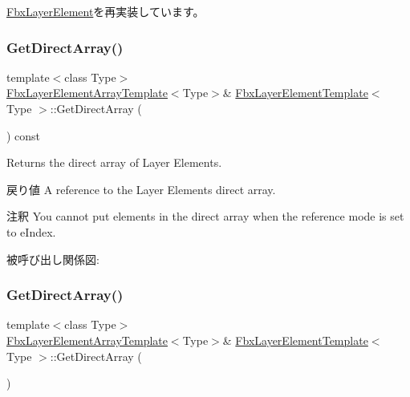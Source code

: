 \hyperlink{class_fbx_layer_element_aa60d2178a7601f0e78a472fa7fd774aa}{Fbx\+Layer\+Element}を再実装しています。

\mbox{\label{class_fbx_layer_element_template_a42afd6d78d902570d7b2724cb0336226}} 
\subsubsection{\texorpdfstring{Get\+Direct\+Array()}{GetDirectArray()}\hspace{0.1cm}{\footnotesize\ttfamily [1/2]}}
{\footnotesize\ttfamily template$<$class Type$>$ \\
\hyperlink{class_fbx_layer_element_array_template}{Fbx\+Layer\+Element\+Array\+Template}$<$Type$>$\& \hyperlink{class_fbx_layer_element_template}{Fbx\+Layer\+Element\+Template}$<$ Type $>$\+::Get\+Direct\+Array (\begin{DoxyParamCaption}{ }\end{DoxyParamCaption}) const}

Returns the direct array of Layer Elements. \begin{DoxyReturn}{戻り値}
A reference to the Layer Elements direct array. 
\end{DoxyReturn}
\begin{DoxyRemark}{注釈}
You cannot put elements in the direct array when the reference mode is set to e\+Index. 
\end{DoxyRemark}
被呼び出し関係図\+:
\mbox{\label{class_fbx_layer_element_template_ad34f79d4abaa1d101cc756048a5f11b9}} 
\subsubsection{\texorpdfstring{Get\+Direct\+Array()}{GetDirectArray()}\hspace{0.1cm}{\footnotesize\ttfamily [2/2]}}
{\footnotesize\ttfamily template$<$class Type$>$ \\
\hyperlink{class_fbx_layer_element_array_template}{Fbx\+Layer\+Element\+Array\+Template}$<$Type$>$\& \hyperlink{class_fbx_layer_element_template}{Fbx\+Layer\+Element\+Template}$<$ Type $>$\+::Get\+Direct\+Array (\begin{DoxyParamCaption}{ }\end{DoxyParamCaption})}

